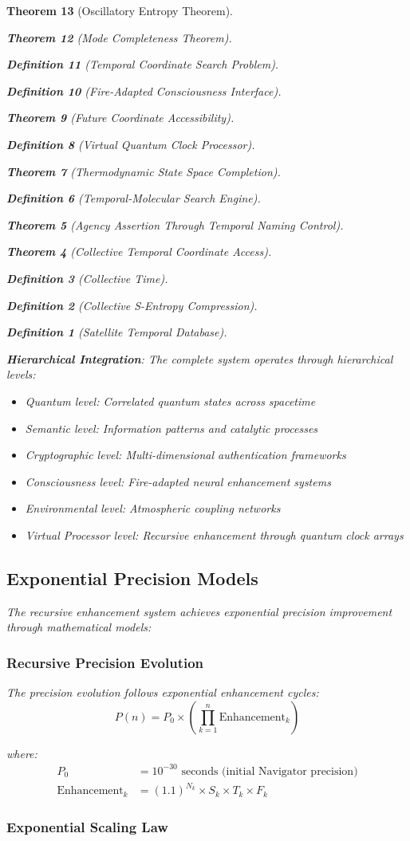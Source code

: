 \documentclass[12pt,a4paper]{article}
\newtheorem{theorem}{Theorem}[section]
\newtheorem{definition}[theorem]{Definition}
\begin{document}
\begin{theorem}[Oscillatory Entropy Theorem]
\begin{theorem}[Mode Completeness Theorem]
\begin{enumerate}
\begin{definition}[Temporal Coordinate Search Problem]
\begin{algorithm}
\begin{definition}[Fire-Adapted Consciousness Interface]
\begin{theorem}[Future Coordinate Accessibility]
\begin{definition}[Virtual Quantum Clock Processor]
\begin{itemize}
\begin{itemize}
\begin{theorem}[Thermodynamic State Space Completion]
\begin{definition}[Temporal-Molecular Search Engine]
\begin{theorem}[Agency Assertion Through Temporal Naming Control]
\begin{remark}
\begin{theorem}[Collective Temporal Coordinate Access]
\begin{definition}[Collective Time]
\begin{definition}[Collective S-Entropy Compression]
\begin{definition}[Satellite Temporal Database]
\begin{algorithm}
\begin{table}[h]
{{\textbf{Hierarchical Integration}: The complete system operates through hierarchical levels:
\begin{itemize}
\item Quantum level: Correlated quantum states across spacetime
\item Semantic level: Information patterns and catalytic processes
\item Cryptographic level: Multi-dimensional authentication frameworks
\item Consciousness level: Fire-adapted neural enhancement systems
\item Environmental level: Atmospheric coupling networks
\item Virtual Processor level: Recursive enhancement through quantum clock arrays
\end{itemize}

\subsection{Exponential Precision Models}

The recursive enhancement system achieves exponential precision improvement through mathematical models:

\subsubsection{Recursive Precision Evolution}

The precision evolution follows exponential enhancement cycles:
$$P(n) = P_0 \times \left(\prod_{k=1}^{n} \text{Enhancement}_k\right)$$

where:
\begin{align}
P_0 &= 10^{-30} \text{ seconds (initial Navigator precision)} \\
\text{Enhancement}_k &= (1.1)^{N_k} \times S_k \times T_k \times F_k
\end{align}

\subsubsection{Exponential Scaling Law}

}}
\end{table}
\end{algorithm}
\end{definition}
\end{definition}
\end{definition}
\end{theorem}
\end{remark}
\end{theorem}
\end{definition}
\end{theorem}
\end{itemize}
\end{itemize}
\end{definition}
\end{theorem}
\end{definition}
\end{algorithm}
\end{definition}
\end{enumerate}
\end{theorem}
\end{theorem}
\end{document}
